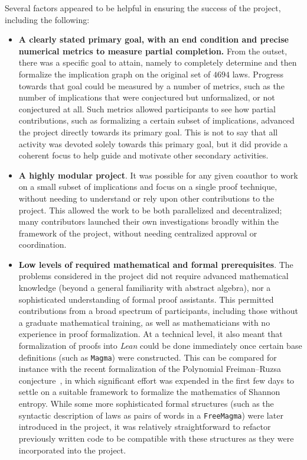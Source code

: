 Several factors appeared to be helpful in ensuring the success of the project, including the following:
\begin{itemize}
\item \textbf{A clearly stated primary goal, with an end condition and precise numerical metrics to measure partial completion.}  From the outset, there was a specific goal to attain, namely to completely determine and then formalize the implication graph on the original set of $4694$ laws.  Progress towards that goal could be measured by a number of metrics, such as the number of implications that were conjectured but unformalized, or not conjectured at all.   Such metrics allowed participants to see how partial contributions, such as formalizing a certain subset of implications, advanced the project directly towards its primary goal.  This is not to say that all activity was devoted solely towards this primary goal, but it did provide a coherent focus to help guide and motivate other secondary activities.
\item \textbf{A highly modular project}.  It was possible for any given coauthor to work on a small subset of implications and focus on a single proof technique, without needing to understand or rely upon other contributions to the project.  This allowed the work to be both parallelized and decentralized; many contributors launched their own investigations broadly within the framework of the project, without needing centralized approval or coordination.
\item \textbf{Low levels of required mathematical and formal prerequisites}.  The problems considered in the project did not require advanced mathematical knowledge (beyond a general familiarity with abstract algebra), nor a sophisticated understanding of formal proof assistants.  This permitted contributions from a broad spectrum of participants, including those without a graduate mathematical training, as well as mathematicians with no experience in proof formalization.  At a technical level, it also meant that formalization of proofs into \emph{Lean} could be done immediately once certain base definitions (such as \texttt{Magma}) were constructed.  This can be compared for instance with the recent formalization of the Polynomial Freiman--Ruzsa conjecture~\cite{PFR_Tao_Dilles_2023}, in which significant effort was expended in the first few days to settle on a suitable framework to formalize the mathematics of Shannon entropy.  While some more sophisticated formal structures (such as the syntactic description of laws as pairs of words in a \texttt{FreeMagma}) were later introduced in the project, it was relatively straightforward to refactor previously written code to be compatible with these structures as they were incorporated into the project.

\end{itemize}
